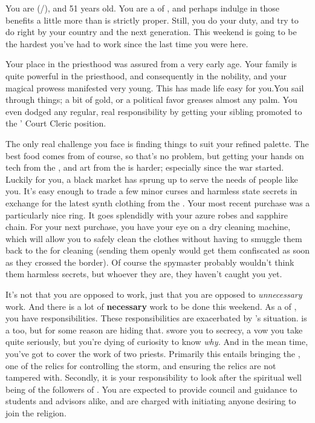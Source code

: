 \documentclass[char]{GL2020}
\begin{document}
\name{\cHedonist{}}


You are \cHedonist{} (\cHedonist{\they}/\cHedonist{\them}), and 51 years old. You are a \cHedonist{\cleric} of \cFarmGod{}, and perhaps indulge in those benefits a little more than is strictly proper. Still, you do your duty, and try to do right by your country and the next generation. This weekend is going to be the hardest you’ve had to work since the last time you were here.

Your place in the priesthood was assured from a very early age. Your family is quite powerful in the priesthood, and consequently in the nobility, and your magical prowess manifested very young. This has made life easy for you.You sail through things; a bit of gold, or a political favor greases almost any palm. You even dodged any regular, real responsibility by getting your sibling promoted to the \cQueen{\Majesty}’ Court Cleric position.

The only real challenge you face is finding things to suit your refined palette. The best food comes from \pFarm{} of course, so that’s no problem, but getting your hands on tech from the \pTech{}, and art from the \pShip{} is harder; especially since the war started. Luckily for you, a black market has sprung up to serve the needs of people like you. It’s easy enough to trade a few minor curses and harmless state secrets in exchange for the latest synth clothing from the \pTech{}. Your most recent purchase was a particularly nice ring. It goes splendidly with your azure robes and sapphire chain. For your next purchase, you have your eye on a dry cleaning machine, which will allow you to safely clean the clothes without having to smuggle them back to the \pTech{} for cleaning (sending them openly would get them confiscated as soon as they crossed the border). Of course the \pFarm{} spymaster probably wouldn’t think them harmless secrets, but whoever they are, they haven’t caught you yet.

It’s not that you are opposed to work, just that you are opposed to \emph{unnecessary} work. And there is a lot of \textbf{necessary} work to be done this weekend. As a \cHedonist{\cleric} of \cFarmGod{}, you have responsibilities. These responsibilities are exacerbated by \cInterpol{}’s situation. \cInterpol{} is a \cInterpol{\cleric} too, but for some reason \cInterpol{\they} are hiding that.  swore you to secrecy, a vow you take quite seriously, but you’re dying of curiosity to know \emph{why.} And in the mean time, you’ve got to cover the work of two priests. Primarily this entails bringing the \iPitcher{}, one of the \pFarm{} relics for controlling the storm, and ensuring the relics are not tampered with. Secondly, it is your responsibility to look after the spiritual well being of the followers of \cFarmGod{}. You are expected to provide council and guidance to students and advisors alike, and are charged with initiating anyone desiring to join the religion.
\end{document}
